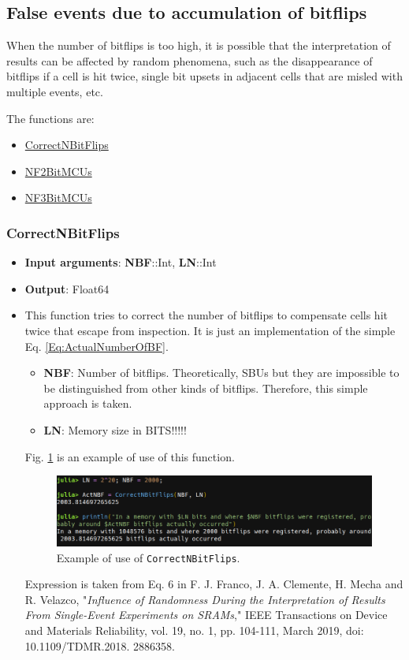 \subsection{False events due to accumulation of bitflips}\label{SubSec:FalseEvents}
%
When the number of bitflips is too high, it is possible that the interpretation of results can be affected by random phenomena, such as the disappearance of bitflips if a cell is hit twice, single bit upsets in adjacent cells that are misled with multiple events, etc. 

The functions are:
\begin{itemize}
	\item  \hyperref[Fun:CorrectNBitFlips]{CorrectNBitFlips}
	\item \hyperref[Fun:NF2BitMCUs]{NF2BitMCUs}
	\item \hyperref[Fun:NF3BitMCUs]{NF3BitMCUs}
\end{itemize}

\subsubsection*{CorrectNBitFlips}\label{Fun:CorrectNBitFlips}
%
\begin{itemize}
	\item \textbf{Input arguments}: \textbf{NBF}::Int, \textbf{LN}::Int
	\item \textbf{Output}: Float64
	\item This function tries to correct the number of bitflips to compensate cells hit twice that
	escape from inspection. It is just an implementation of the simple Eq. \ref{Eq:ActualNumberOfBF}.
	\begin{itemize}
		\item \textbf{NBF}: Number of bitflips. Theoretically, SBUs but they are impossible to be distinguished 
		from other kinds of bitflips. Therefore, this simple approach is taken.
		\item \textbf{LN}: Memory size in BITS!!!!!
	\end{itemize}	 
	Fig. \ref{fig:Example_CorrectNBitflips} is an example of use of this function.
	
	\begin{figure}[h!]
		\centering
		\includegraphics[width=0.75\columnwidth]{fig/functions/CorrectNBitFlips.png}
		\caption{Example of use of \texttt{CorrectNBitFlips}.}
		\label{fig:Example_CorrectNBitflips}
	\end{figure}
	
	Expression is taken from Eq. 6 in F. J. Franco, J. A. Clemente, H. Mecha and R. Velazco, 
	"\textit{Influence of Randomness During the Interpretation of Results From Single-Event Experiments 
		on SRAMs}," IEEE Transactions on Device and Materials Reliability, vol. 19, no. 1, pp. 104-111, 
	March 2019, doi: 10.1109/TDMR.2018.
	2886358.		
\end{itemize}
%
